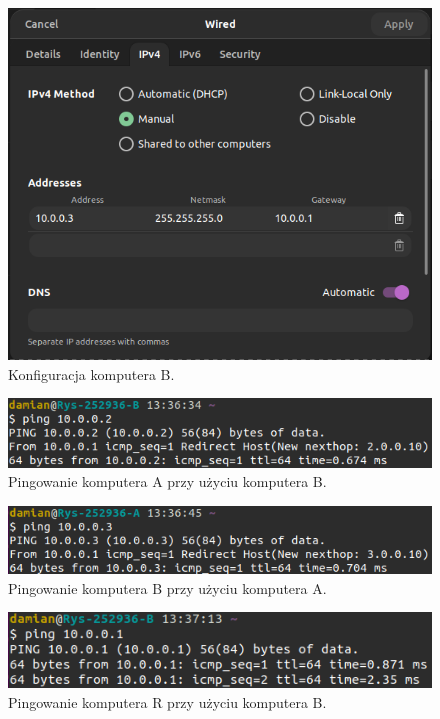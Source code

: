 \documentclass{article}
\begin{document}
\begin{figure}[H]
    \centering
    \includegraphics[totalheight=5cm]{1.IP/VirtualBoxVM_kLXjwFow7R.png}  
    \caption{Konfiguracja komputera B.}
    \label{2}
\end{figure}



\begin{figure}[H]
    \centering
    \includegraphics[totalheight=2cm]{1.IP/VirtualBoxVM_A7w5H7kGvq.png}  
    \caption{Pingowanie komputera A przy użyciu komputera B.}
    \label{2}
\end{figure}
\begin{figure}[H]
    \centering
    \includegraphics[totalheight=2cm]{1.IP/VirtualBoxVM_bHLFJ38p1v.png}  
    \caption{Pingowanie komputera B przy użyciu komputera A.}
    \label{2}
\end{figure}
\begin{figure}[H]
    \centering
    \includegraphics[totalheight=2cm]{1.IP/VirtualBoxVM_LWctJXXX3X.png}  
    \caption{Pingowanie komputera R przy użyciu komputera B.}
    \label{2}
\end{figure}
\end{document}
